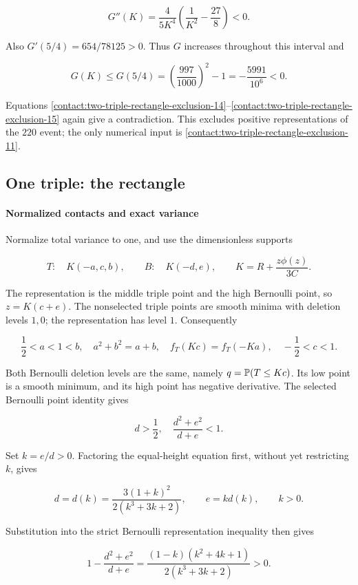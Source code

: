 \[
 G''(K)=\frac4{5K^4}\left(\frac1{K^2}-\frac{27}8\right)<0.
\]

Also $G'(5/4)=654/78125>0$. Thus $G$ increases throughout this
interval and

\[
 G(K)\leq G(5/4)=\left(\frac{997}{1000}\right)^2-1
 =-\frac{5991}{10^6}<0.
\]

Equations \eqref{contact:two-triple-rectangle-exclusion-14}--\eqref{contact:two-triple-rectangle-exclusion-15} again give a contradiction. This excludes positive
representations of the $220$ event; the only numerical input is \eqref{contact:two-triple-rectangle-exclusion-11}.
\subsection{One triple: the rectangle}\label{contact:one-triple-bernoulli-rectangle}


\paragraph{Normalized contacts and exact variance}

Normalize total variance to one, and use the dimensionless supports

\[
 T:\quad K(-a,c,b),\qquad B:\quad K(-d,e),
 \qquad K=R+\frac{z\phi(z)}{3C}.
\]

The representation is the middle triple point and the high Bernoulli point, so
$z=K(c+e)$. The nonselected triple points are smooth minima with
deletion levels $1,0$; the representation has level $1$. Consequently

\[
 \frac12<a<1<b,\quad a^2+b^2=a+b,\quad
 f_T(Kc)=f_T(-Ka),\quad -\frac12<c<1.
\tag{B.9.1}\label{contact:one-triple-bernoulli-rectangle-1}
\]

Both Bernoulli deletion levels are the same, namely $q=\mathbb P(T\le Kc)$.
Its low point is a smooth minimum, and its high point has negative
derivative. The selected Bernoulli point identity gives

\[
 d>\frac12,\quad \frac{d^2+e^2}{d+e}<1.
\]

Set $k=e/d>0$. Factoring the equal-height equation first, without yet
restricting $k$, gives

\[
 d=d(k)=\frac{3(1+k)^2}{2(k^3+3k+2)},\qquad e=kd(k),
 \qquad k>0.
\tag{B.9.2}\label{contact:one-triple-bernoulli-rectangle-2}
\]

Substitution into the strict Bernoulli representation inequality then gives

\[
 1-\frac{d^2+e^2}{d+e}
 =\frac{(1-k)(k^2+4k+1)}{2(k^3+3k+2)}>0.
\]

